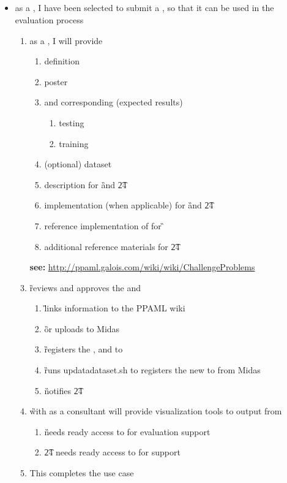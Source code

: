 \documentclass[8pt,letterpaper]{article} %
\newenvironment{slimlist}{
  \begin{itemize}
    \setlength{\topsep}{0pt}
    \setlength{\itemsep}{1pt}
    \setlength{\parsep}{0pt}
    \setlength{\parskip}{0pt}
}{\end{itemize}}
\newenvironment{mitemize}[1]{
  \subsection*{#1}
  \begin{slimlist}
}{
\end{slimlist}
\vspace{1em}
\pagebreak
}
\begin{document}
\begin{mitemize}{\de}
\item as a \de, I have been selected to submit a \cp, so that it can be used in the evaluation process
  \begin{enumerate}
  \item as a \de, I will provide 
    \begin{enumerate}
    \item \cp definition
    \item \cp poster 
    \item \ds and corresponding \gs (expected results)
      \begin{enumerate}
      \item testing
      \item training
      \end{enumerate}
    \item (optional) dataset  \gen
    \item \tev description for \G and \t24
    \item \tev implementation (when applicable) for \G and \t24
    \item reference implementation of \sol for \G
    \item additional reference materials for \t24 
    \end{enumerate}
  \item[{\bf see:}] \url{http://ppaml.galois.com/wiki/wiki/ChallengeProblems}
  \item \G reviews and approves the \cp and 
    \begin{enumerate}
    \item \G links \cp information to the PPAML wiki
    \item \G or \de uploads \ds to Midas
    \item \G registers the \cp, and \tev to \ptk
    \item \G runs updatadataset.sh to registers the new  to \ptk from Midas
    \item \G notifies \t24
    \end{enumerate}
  \item \G with \de as a consultant will provide visualization tools to \rep output from 
    \begin{enumerate}
    \item \G needs ready access to \de for evaluation support
    \item \t24 needs ready access to \de for \cp support
    \end{enumerate}
  \item This completes the use case
  \end{enumerate}
\end{mitemize}
\end{document}
